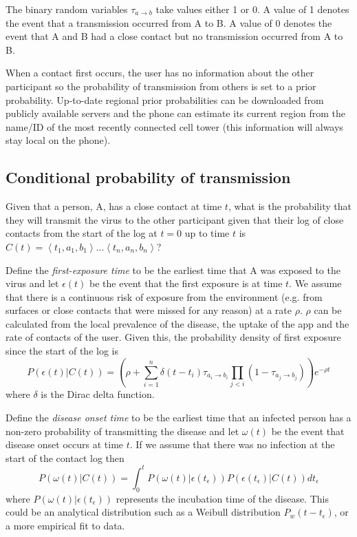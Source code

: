 \documentclass{article}
\begin{document}
The binary random variables $\tau_{a\rightarrow b}$ take values either 1 or 0. A value of 1 denotes the event that a transmission occurred from A to B. A value of 0 denotes the event that A and B had a close contact but no transmission occurred from A to B.

When a contact first occurs, the user has no information about the other participant so the probability of transmission from others is set to a prior probability. Up-to-date regional prior probabilities can be downloaded from publicly available servers and the phone can estimate its current region from the name/ID of the most recently connected cell tower (this information will always stay local on the phone).

\subsection{Conditional probability of transmission}

Given that a person, A, has a close contact at time $t$, what is the probability that they will transmit the virus to the other participant given that their log of close contacts from the start of the log at $t=0$ up to time $t$ is $C(t) = \left< t_{1},a_1,b_1 \right> ... \left< t_{n},a_n,b_n \right>$?

Define the \textit{first-exposure time} to be the earliest time that A was exposed to the virus and let $\epsilon(t)$ be the event that the first exposure is at time $t$. We assume that there is a continuous risk of exposure from the environment (e.g. from surfaces or close contacts that were missed for any reason) at a rate $\rho$. $\rho$ can be calculated from the local prevalence of the disease, the uptake of the app and the rate of contacts of the user. Given this, the probability density of first exposure since the start of the log is
\begin{equation}
P\left(\epsilon(t)|C(t)\right) = \left(\rho + \sum_{i=1}^n \delta(t - t_i)\tau_{a_i\rightarrow b_i} \prod_{j<i}(1-\tau_{a_j\rightarrow b_j})\right) e^{-\rho t}
\label{firstExposure}
\end{equation}
where $\delta$ is the Dirac delta function.

Define the \textit{disease onset time} to be the earliest time that an infected person has a non-zero probability of transmitting the disease and let $\omega(t)$ be the event that disease onset occurs at time $t$. If we assume that there was no infection at the start of the contact log then
\[
P(\omega(t)|C(t)) = \int_0^{t} P(\omega(t)|\epsilon(t_\epsilon))P(\epsilon(t_\epsilon)|C(t)) dt_\epsilon
\]
where $P(\omega(t)|\epsilon(t_\epsilon))$ represents the incubation time of the disease. This could be an analytical distribution such as a Weibull distribution $P_w(t-t_\epsilon)$, or a more empirical fit to data.
\end{document}

